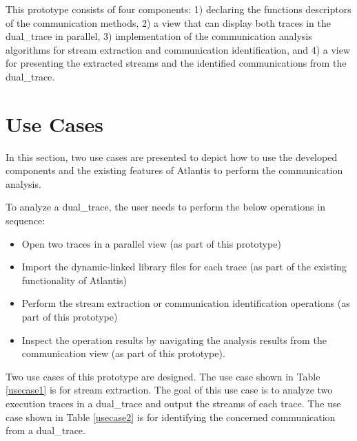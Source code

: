 \documentclass[12pt,oneside]{book}
\begin{document}
This prototype consists of four components: 1) declaring the functions descriptors of the communication methods, 2) a view that can display both traces in the dual\_trace in parallel, 3) implementation of the communication analysis algorithms for stream extraction and communication identification, and 4) a view for presenting the extracted streams and the identified communications from the dual\_trace.

\section{Use Cases}
In this section, two use cases are presented to depict how to use the developed components and the existing features of Atlantis to perform the communication analysis.

To analyze a dual\_trace, the user needs to perform the below operations in sequence:
\begin{itemize}
\item Open two traces in a parallel view (as part of this prototype)
\item Import the dynamic-linked library files for each trace (as part of the existing functionality of Atlantis)
\item Perform the stream extraction or communication identification operations (as part of this prototype)
\item Inspect the operation results by navigating the analysis results from the communication view (as part of this prototype).
\end{itemize}

Two use cases of this prototype are designed. The use case shown in Table \ref{usecase1} is for stream extraction. The goal of this use case is to analyze two execution traces in a dual\_trace and output the streams of each trace. The use case shown in Table \ref{usecase2} is for identifying the concerned communication from a dual\_trace. 
\end{document}
